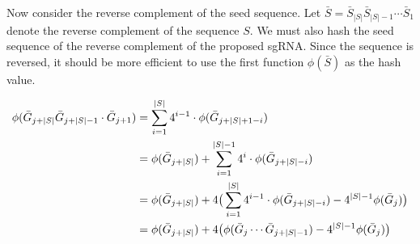 \documentclass{article}[12pt]
\begin{document}
Now consider the reverse complement of the seed sequence.  
Let $\bar{S} = \bar{S}_{|S|} \bar{S}_{|S| - 1} \cdots \bar{S}_{1}$
denote the reverse complement of the sequence $S$.  
We must also hash the seed sequence of the reverse complement 
of the proposed sgRNA.  Since the sequence is reversed, it should
be more efficient to use the first function $\phi(\bar{S})$ as the hash
value.  

\begin{align}
\phi( \bar{G}_{j + |S|} \bar{G}_{j + |S| - 1} \cdot \bar{G}_{j + 1})
&= \sum_{i = 1}^{|S|} 4^{i - 1} \cdot \phi(\bar{G}_{j + |S| + 1 - i})
\notag \\
&= \phi ( \bar{G}_{j + |S|}) + \sum_{i = 1}^{|S| - 1} 4^{i} \cdot \phi(\bar{G}_{j + |S| - i})
\notag \\
&= \phi ( \bar{G}_{j + |S|})  + 4 \big( \sum_{i = 1}^{|S|} 4^{i - 1} \cdot \phi( \bar{G}_{j + |S| - i})
- 4^{|S| - 1} \phi( \bar{G}_{j}) \big)
\notag \\
&= \phi ( \bar{G}_{j + |S|})  + 4 \big( \phi(\bar{G}_{j} \cdots \bar{G}_{j + |S| - 1}) - 4^{|S| - 1}
\phi(\bar{G}_{j}) \big)
\notag
\end{align}
\end{document}
